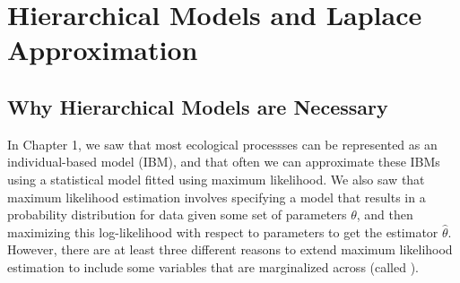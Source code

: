 \chapter{Hierarchical Models and Laplace Approximation}\label{chp:hierarchical_models}

\section{Why Hierarchical Models are Necessary} \label{sec:Chap2_why}

In Chapter 1, we saw that most ecological processses can be represented as an individual-based model (IBM), and that often we can approximate these IBMs using a statistical model fitted using maximum likelihood. We also saw that maximum likelihood estimation involves specifying a model that results in a probability distribution for data given some set of parameters \( \theta \), and then maximizing this log-likelihood with respect to parameters to get the estimator \( \hat{\theta} \).  However, there are at least three different reasons to extend maximum likelihood estimation to include some variables that are marginalized across (called ).  

